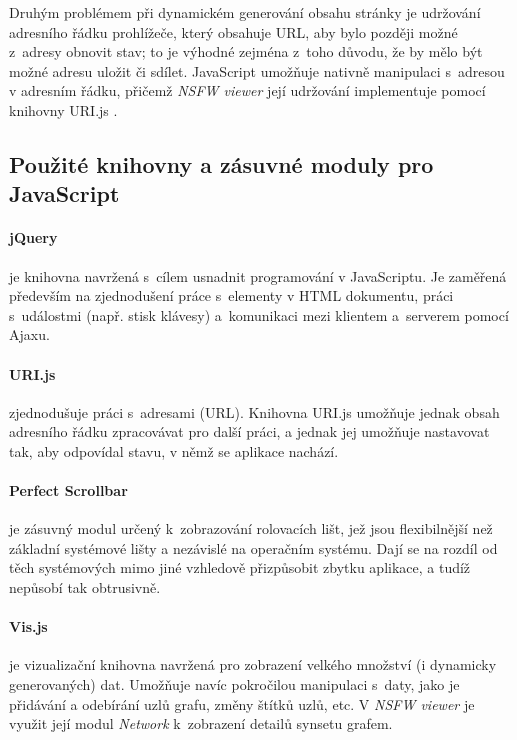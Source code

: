 \documentclass[a4paper, 11pt, oneside, showtrims]{book}
\newcommand{\simplywn}{\textit{NSFW viewer} }
\begin{document}
					Druhým problémem při dynamickém generování obsahu stránky je udržování adresního řádku prohlížeče, který obsahuje URL, aby bylo později možné z~adresy obnovit stav; to je výhodné zejména z~toho důvodu, že by mělo být možné adresu uložit či sdílet. JavaScript umožňuje nativně manipulaci s~adresou v adresním řádku, přičemž \simplywn její udržování implementuje pomocí knihovny URI.js \parencite{urijsWeb}.

				\subsection{Použité knihovny a zásuvné moduly pro JavaScript}

					\paragraph{jQuery} je knihovna navržená s~cílem usnadnit programování v JavaScriptu. Je zaměřená především na zjednodušení práce s~elementy v HTML dokumentu, práci s~událostmi (např. stisk klávesy) a~komunikaci mezi klientem a~serverem pomocí Ajaxu. \parencite{jqueryWeb}

					\paragraph{URI.js} zjednodušuje práci s~adresami (URL). Knihovna URI.js umožňuje jednak obsah adresního řádku zpracovávat pro další práci, a jednak jej umožňuje nastavovat tak, aby odpovídal stavu, v němž se aplikace nachází. \parencite{urijsWeb}

					\paragraph{Perfect Scrollbar} je zásuvný modul určený k~zobrazování rolovacích lišt, jež jsou flexibilnější než základní systémové lišty a nezávislé na operačním systému. Dají se na rozdíl od těch systémových mimo jiné vzhledově přizpůsobit zbytku aplikace, a tudíž nepůsobí tak obtrusivně. \parencite{perfectScrollbarGithub}

					\paragraph{Vis.js} je vizualizační knihovna navržená pro zobrazení velkého množství (i dynamicky generovaných) dat. Umožňuje navíc pokročilou manipulaci s~daty, jako je přidávání a odebírání uzlů grafu, změny štítků uzlů, etc. V \simplywn je využit její modul \textit{Network} k~zobrazení detailů synsetu grafem. \parencite{visjWeb}
\end{document}
